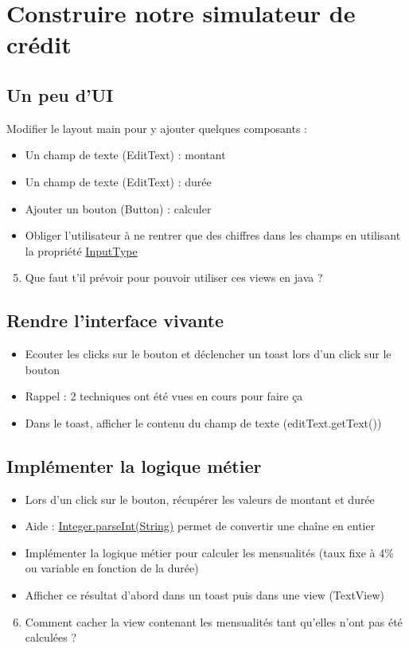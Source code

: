 \documentclass{article}
\begin{document}
\section{Construire notre simulateur de crédit}
\subsection{Un peu d'UI}
Modifier le layout main pour y ajouter quelques composants :
\begin{itemize}
\item Un champ de texte (EditText) : montant
\item Un champ de texte (EditText) : durée
\item Ajouter un bouton (Button) : calculer
\item Obliger l'utilisateur à ne rentrer que des chiffres dans les champs en utilisant la propriété \href{http://developer.android.com/reference/android/widget/TextView.html#attr_android:inputType}{InputType}
\end{itemize}
\begin{enumerate}
 \setcounter{enumi}{4}
\item Que faut t'il prévoir pour pouvoir utiliser ces views en java ?
\end{enumerate}
\subsection{Rendre l'interface vivante}
\begin{itemize}
\item Ecouter les clicks sur le bouton et déclencher un toast lors d'un click sur le bouton
\item Rappel : 2 techniques ont été vues en cours pour faire ça
\item Dans le toast, afficher le contenu du champ de texte (editText.getText())
\end{itemize}
\subsection{Implémenter la logique métier}
\begin{itemize}
\item Lors d'un click sur le bouton, récupérer les valeurs de montant et durée
\item Aide : \href{http://developer.android.com/reference/java/lang/Integer.html#parseInt(java.lang.String)}{Integer.parseInt(String)} permet de convertir une chaîne en entier
\item Implémenter la logique métier pour calculer les mensualités (taux fixe à 4\% ou variable en fonction de la durée)
\item Afficher ce résultat d'abord dans un toast puis dans une view (TextView)
\end{itemize}
\begin{enumerate}
 \setcounter{enumi}{5}
\item Comment cacher la view contenant les mensualités tant qu'elles n'ont pas été calculées ?
\end{enumerate}
\newpage
\end{document}
